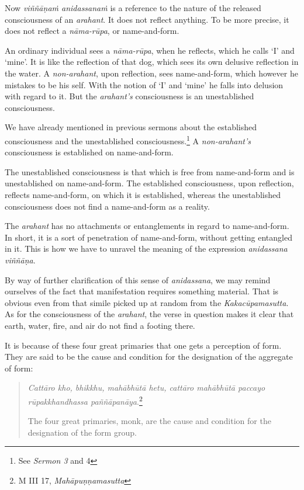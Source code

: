 Now \emph{viññāṇaṁ anidassanaṁ} is a reference to the nature of the released consciousness of an \emph{arahant}. It does not reflect anything. To be more precise, it does not reflect a \emph{nāma-rūpa}, or name-and-form.

An ordinary individual sees a \emph{nāma-rūpa}, when he reflects, which he calls `I' and `mine'. It is like the reflection of that dog, which sees its own delusive reflection in the water. A \emph{non-arahant}, upon reflection, sees name-and-form, which however he mistakes to be his self. With the notion of `I' and `mine' he falls into delusion with regard to it. But the \emph{arahant's} consciousness is an unestablished consciousness.

We have already mentioned in previous sermons about the established consciousness and the unestablished consciousness.\footnote{See \emph{Sermon 3} and 4} A \emph{non-arahant's} consciousness is established on name-and-form.

The unestablished consciousness is that which is free from name-and-form and is unestablished on name-and-form. The established consciousness, upon reflection, reflects name-and-form, on which it is established, whereas the unestablished consciousness does not find a name-and-form as a reality.

The \emph{arahant} has no attachments or entanglements in regard to name-and-form. In short, it is a sort of penetration of name-and-form, without getting entangled in it. This is how we have to unravel the meaning of the expression \emph{anidassana viññāṇa}.

By way of further clarification of this sense of \emph{anidassana}, we may remind ourselves of the fact that manifestation requires something material. That is obvious even from that simile picked up at random from the \emph{Kakacūpamasutta}. As for the consciousness of the \emph{arahant}, the verse in question makes it clear that earth, water, fire, and air do not find a footing there.

It is because of these four great primaries that one gets a perception of form. They are said to be the cause and condition for the designation of the aggregate of form:

\begin{quote}
\emph{Cattāro kho, bhikkhu, mahābhūtā hetu, cattāro mahābhūtā paccayo rūpakkhandhassa paññāpanāya}.\footnote{M III 17, \emph{Mahāpuṇṇamasutta}}

The four great primaries, monk, are the cause and condition for the designation of the form group.
\end{quote}

